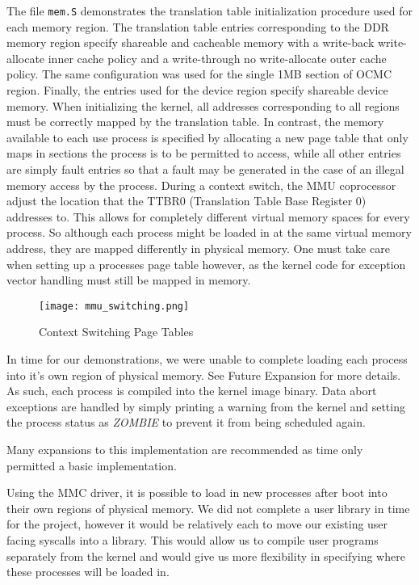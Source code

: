 \documentclass[12pt]{article}
\newcommand{\code}[1]{\colorbox{codegray}{\texttt{\footnotesize{#1}}}}
\begin{document}
The file \code{mem.S} demonstrates the translation table initialization
procedure used for each memory region. The translation table entries
corresponding to the DDR memory region specify shareable and cacheable memory with
a write-back write-allocate inner cache policy and a write-through no
write-allocate outer cache policy. The same configuration was used for the
single 1MB section of OCMC region. Finally, the entries used for the device
region specify shareable device memory. When initializing the kernel, all
addresses corresponding to all regions must be correctly mapped by the
translation table. In contrast, the memory available to each use process is
specified by allocating a new page table that only maps in sections the
process is to be permitted to access, while all other entries are simply
fault entries so that a fault may be generated in the case of an illegal
memory access by the process.  During a context switch, the MMU coprocessor adjust the location that
the TTBR0 (Translation Table Base Register 0) addresses to. This allows for
completely different virtual memory spaces for every process. So although
each process might be loaded in at the same virtual memory address, they
are mapped differently in physical memory.  One must take care when setting
up a processes page table however, as the kernel code for exception vector
handling must still be mapped in memory.

\begin{figure}[!htbp]
	\centering
	\texttt{[image: mmu\_switching.png]}
	\caption{Context Switching Page Tables}
	\label{fig_flow}
\end{figure}

In time for our demonstrations, we were unable to complete loading each
process into it's own region of physical memory. See Future Expansion for
more details.  As such, each process is compiled into the kernel image
binary. Data abort exceptions are handled by simply printing a warning from the
kernel and setting the process status as \textit{ZOMBIE} to prevent it from
being scheduled again.

Many expansions to this implementation are recommended as time only
permitted a basic implementation.

Using the MMC driver, it is possible to load in new processes after
boot into their own regions of physical memory. We did not complete a
user library in time for the project, however it would be relatively
each to move our existing user facing syscalls into a library. This
would allow us to compile user programs separately from the kernel and
would give us more flexibility in specifying where these processes will
be loaded in.
\end{document}
